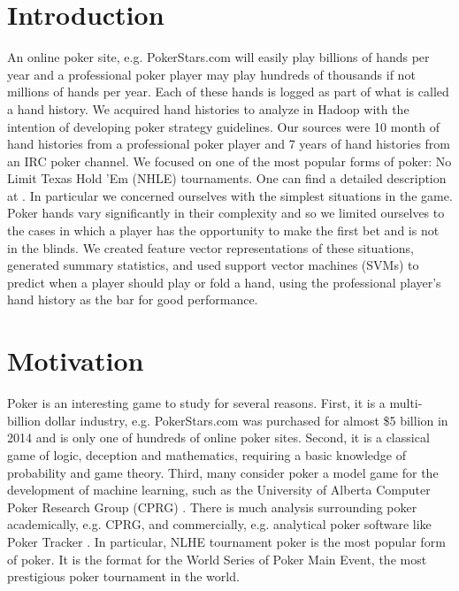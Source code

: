 \documentclass[twoside]{article}
\begin{document}
\begin{multicols}{2} %

\section{Introduction}
An online poker site, e.g. PokerStars.com will easily play billions of hands per year and a professional poker player may play hundreds of thousands if not millions of hands per year. Each of these hands is logged as part of what is called a hand history.
We acquired hand histories to analyze in Hadoop with the intention of developing poker strategy guidelines. Our sources were 10 month of hand histories from a professional poker player and 7 years of hand histories from an IRC poker channel.
We focused on one of the most popular forms of poker: No Limit Texas Hold 'Em (NHLE) tournaments. One can find a detailed description at \cite{TexasHoldem}. In particular we concerned ourselves with the simplest situations in the game. Poker hands vary significantly in their complexity and so we limited ourselves to the cases in which a player has the opportunity to make the first bet and is not in the blinds. We created feature vector representations of these situations, generated summary statistics, and used support vector machines (SVMs) to predict when a player should play or fold a hand, using the professional player's hand history as the bar for good performance.


\section{Motivation}

Poker is an interesting game to study for several reasons. First, it is a multi-billion dollar industry, e.g. PokerStars.com was purchased for almost \$5 billion in 2014 \cite{PokerStarsAcquired} and is only one of hundreds of online poker sites. Second, it is a classical game of logic, deception and mathematics, requiring a basic knowledge of probability and game theory. Third, many consider poker a model game for the development of machine learning, such as the University of Alberta Computer Poker Research Group (CPRG) \cite{SVMPoker}. There is much analysis surrounding poker academically, e.g. CPRG, and commercially, e.g. analytical poker software like Poker Tracker \cite{PokerTracker}. In particular, NLHE tournament poker is the most popular form of poker. It is the format for the World Series of Poker Main Event, the most prestigious poker tournament in the world. 


\end{multicols}
\end{document}
